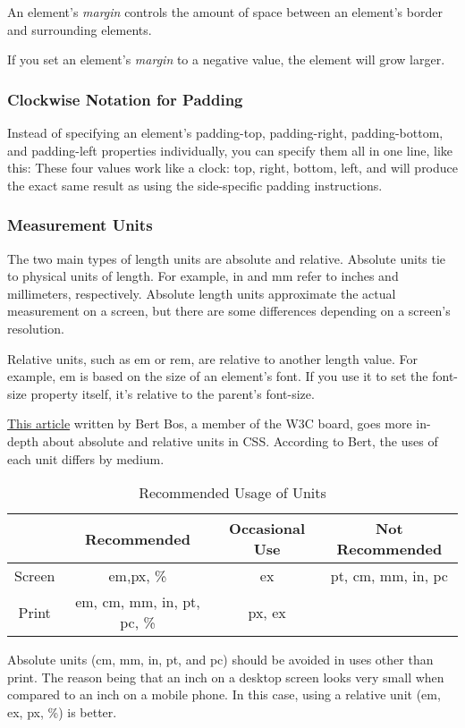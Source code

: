An element's \emph{margin} controls the amount of space between an element's border and surrounding elements.

If you set an element's \emph{margin} to a negative value, the element will grow larger.

\subsubsection{Clockwise Notation for Padding}
Instead of specifying an element's padding-top, padding-right, padding-bottom, and padding-left properties individually, you can specify them all in one line, like this:
These four values work like a clock: top, right, bottom, left, and will produce the exact same result as using the side-specific padding instructions.

\subsubsection{Measurement Units}
The two main types of length units are absolute and relative. Absolute units tie to physical units of length. For example, in and mm refer to inches and millimeters, respectively. Absolute length units approximate the actual measurement on a screen, but there are some differences depending on a screen's resolution.

Relative units, such as em or rem, are relative to another length value. For example, em is based on the size of an element's font. If you use it to set the font-size property itself, it's relative to the parent's font-size.

\href{https://www.w3.org/Style/Examples/007/units.en.html}{This article} written by Bert Bos, a member of the W3C board, goes more in-depth about absolute and relative units in CSS. According to Bert, the uses of each unit differs by medium.

\begin{table}[h]
    \centering
    \begin{tabular}{c|c|c|c}
         &Recommended & Occasional Use & Not Recommended\\
         \hline\hline
         Screen & em,px, \%&ex&pt, cm, mm, in, pc \\
         Print& em, cm, mm, in, pt, pc, \%&px, ex&\\ 
    \end{tabular}
    \caption{Recommended Usage of Units}
\end{table}
Absolute units (cm, mm, in, pt, and pc) should be avoided in uses other than print. The reason being that an inch on a desktop screen looks very small when compared to an inch on a mobile phone. In this case, using a relative unit (em, ex, px, \%) is better.

